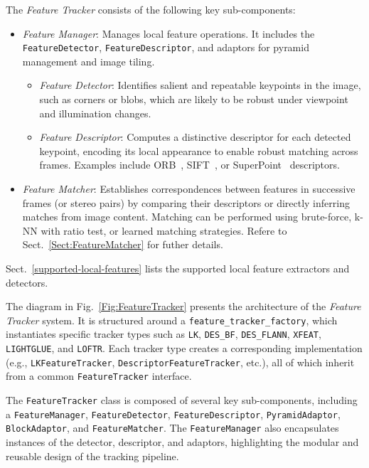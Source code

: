 \documentclass{article}
\begin{document}
The \textit{Feature Tracker} consists of the following key sub-components:

\begin{itemize} 
\item \textit{Feature Manager}: Manages local feature operations. It includes the \texttt{FeatureDetector}, \texttt{FeatureDescriptor}, and adaptors for pyramid management and image tiling. 
\begin{itemize}
\item \textit{Feature Detector}: Identifies salient and repeatable keypoints in the image, such as corners or blobs, which are likely to be robust under viewpoint and illumination changes. 

\item \textit{Feature Descriptor}: Computes a distinctive descriptor for each detected keypoint, encoding its local appearance to enable robust matching across frames. Examples include ORB~\cite{rublee2011orb}, SIFT~\cite{lowe1999object}, or SuperPoint~\cite{detone18superpoint} descriptors.

\end{itemize}

\item \textit{Feature Matcher}: Establishes correspondences between features in successive frames (or stereo pairs) by comparing their descriptors or directly inferring matches from image content. Matching can be performed using brute-force, k-NN with ratio test, or learned matching strategies. Refere to Sect.~\ref{Sect:FeatureMatcher} for futher details.
\end{itemize}

Sect.~\ref{supported-local-features} lists the supported local feature extractors and detectors.

The diagram in Fig.~\ref{Fig:FeatureTracker} presents the architecture of the \textit{Feature Tracker} system. It is structured around a \texttt{feature\_tracker\_factory}, which instantiates specific tracker types such as \texttt{LK}, \texttt{DES\_BF}, \texttt{DES\_FLANN}, \texttt{XFEAT}\cite{barroso2024xfeat}, \texttt{LIGHTGLUE}\cite{lindenberger2023lightglue}, and \texttt{LOFTR}\cite{sun2021loftr}. Each tracker type creates a corresponding implementation (e.g., \texttt{LKFeatureTracker}, \texttt{DescriptorFeatureTracker}, etc.), all of which inherit from a common \texttt{FeatureTracker} interface.

The \texttt{FeatureTracker} class is composed of several key sub-components, including a \texttt{FeatureManager}, \texttt{FeatureDetector}, \texttt{FeatureDescriptor}, \texttt{PyramidAdaptor}, \texttt{BlockAdaptor}, and \texttt{FeatureMatcher}. The \texttt{FeatureManager} also encapsulates instances of the detector, descriptor, and adaptors, highlighting the modular and reusable design of the tracking pipeline.
\end{document}

